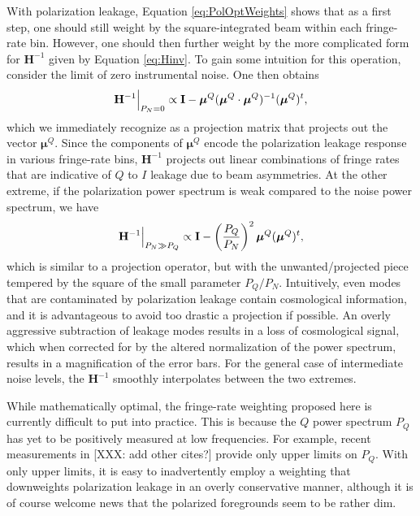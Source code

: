 \documentclass[twocolumn,apj,numberedappendix]{emulateapj}
\begin{document}
With polarization leakage, Equation \eqref{eq:PolOptWeights} shows that as a first step, one should still weight by
the square-integrated beam within each fringe-rate bin. However, one should then further weight by the more complicated
form for $\mathbf{H}^{-1}$ given by Equation \eqref{eq:Hinv}. To gain some intuition for
this operation, consider the limit of zero instrumental noise. One then obtains 
\begin{equation}
\mathbf{H}^{-1} \Big{|}_{P_N =0} \propto \mathbf{I} - \boldsymbol \mu^Q (\boldsymbol \mu^Q \cdot \boldsymbol
\mu^Q )^{-1} (\boldsymbol \mu^Q )^t,
\end{equation}
which we immediately recognize as a projection matrix that projects out the vector $\boldsymbol \mu^Q$. Since the
components of $\boldsymbol \mu^Q$ encode the polarization leakage response in various
fringe-rate bins, $\mathbf{H}^{-1}$ projects out linear combinations of
fringe rates that are indicative of $Q$ to $I$ leakage due to beam asymmetries. At the other
extreme, if the polarization power spectrum is weak compared to the noise power spectrum,
we have
\begin{equation}
\mathbf{H}^{-1} \Big{|}_{P_N \gg P_Q} \propto \mathbf{I} - \left(\frac{P_Q}{P_N} \right)^2 \boldsymbol \mu^Q  (\boldsymbol \mu^Q )^t,
\end{equation}
which is similar to a projection operator, but with the unwanted/projected piece tempered
by the square of the small parameter $P_Q / P_N$. Intuitively, even modes that are
contaminated by polarization leakage contain cosmological information, and it is advantageous
to avoid too drastic a projection if possible. An overly aggressive subtraction of leakage
modes results in a loss of cosmological signal, which when corrected for by the altered
normalization of the power spectrum, results in a magnification of the error bars. For the
general case of intermediate noise levels, the $\mathbf{H}^{-1}$ smoothly interpolates
between the two extremes.

While mathematically optimal, the fringe-rate weighting proposed here is currently difficult
to put into practice. This is because the $Q$ power spectrum $P_Q$ has yet to be positively
measured at low frequencies. For example, recent measurements in \citet{moore_et_al2015}
[XXX: add other cites?] provide only upper limits on $P_Q$. With only upper limits, it is easy
to inadvertently employ a weighting that downweights polarization leakage in an overly
conservative manner, although it is of course welcome news that the polarized foregrounds
seem to be rather dim.
\end{document}
